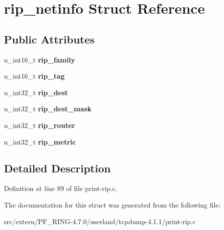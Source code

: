 \hypertarget{structrip__netinfo}{
\section{rip\_\-netinfo Struct Reference}
\label{structrip__netinfo}
}
\subsection*{Public Attributes}
\begin{DoxyCompactItemize}
\item 
\hypertarget{structrip__netinfo_ac6cd74b31c1a3d8ace1a13c7e72bb12d}{
u\_\-int16\_\-t {\bfseries rip\_\-family}}
\label{structrip__netinfo_ac6cd74b31c1a3d8ace1a13c7e72bb12d}

\item 
\hypertarget{structrip__netinfo_ab81988406e4b170a9d3dac9eec3f0a8b}{
u\_\-int16\_\-t {\bfseries rip\_\-tag}}
\label{structrip__netinfo_ab81988406e4b170a9d3dac9eec3f0a8b}

\item 
\hypertarget{structrip__netinfo_a557d9576e39b36ab26b25b2d847e61dd}{
u\_\-int32\_\-t {\bfseries rip\_\-dest}}
\label{structrip__netinfo_a557d9576e39b36ab26b25b2d847e61dd}

\item 
\hypertarget{structrip__netinfo_a0941282415cb7cbf29d4e0b1a9c06c8b}{
u\_\-int32\_\-t {\bfseries rip\_\-dest\_\-mask}}
\label{structrip__netinfo_a0941282415cb7cbf29d4e0b1a9c06c8b}

\item 
\hypertarget{structrip__netinfo_a2c8c87b6c2a9c97335d457250dc60cf1}{
u\_\-int32\_\-t {\bfseries rip\_\-router}}
\label{structrip__netinfo_a2c8c87b6c2a9c97335d457250dc60cf1}

\item 
\hypertarget{structrip__netinfo_a1bedf8e5700482166b5f85c92f700a4a}{
u\_\-int32\_\-t {\bfseries rip\_\-metric}}
\label{structrip__netinfo_a1bedf8e5700482166b5f85c92f700a4a}

\end{DoxyCompactItemize}


\subsection{Detailed Description}


Definition at line 89 of file print-\/rip.c.



The documentation for this struct was generated from the following file:\begin{DoxyCompactItemize}
\item 
src/extern/PF\_\-RING-\/4.7.0/userland/tcpdump-\/4.1.1/print-\/rip.c\end{DoxyCompactItemize}
